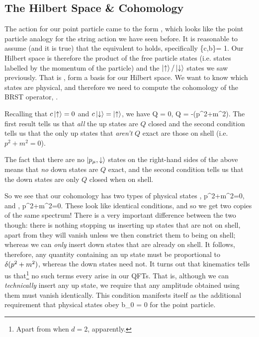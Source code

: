 \subsection{The Hilbert Space \& Cohomology}

The action for our point particle came to the form , which looks like the point particle analogy for the string action we have seen before. It is reasonable to assume (and it is true) that the equivalent to  holds, specifically 
\bse
    \{c,b\}= 1.
\ese 
Our Hilbert space is therefore the product of the free particle states (i.e. states labelled by the momentum of the particle) and the $\ket{\uparrow}/\ket{\downarrow}$ states we saw previously. That is 
\bse 
    , \qand {}
\ese
form a basis for our Hilbert space. We want to know which states are physical, and therefore we need to compute the cohomology of the BRST operator, .

Recalling that $c\ket{\uparrow}=0$ and $c\ket{\downarrow}=\ket{\uparrow}$, we have 
\bse 
    Q = 0, \qand Q = -\big(p^2+m^2\big).
\ese 
The first result tells us that \textit{all} the up states are $Q$ closed and the second condition tells us that the only up states that \textit{aren't} $Q$ exact are those on shell (i.e. $p^2+m^2=0$). 

The fact that there are no $\ket{p_{\mu},\downarrow}$ states on the right-hand sides of the above means that \textit{no} down states are $Q$ exact, and the second condition tells us that the down states are only $Q$ closed when on shell. 

So we see that our cohomology has two types of physical states 
\bse 
    , \quad p^2+m^2=0, 
\ese 
and 
\bse 
    , \quad p^2+m^2=0.
\ese
These look like identical conditions, and so we get two copies of the same spectrum! There is a very important difference between the two though: there is nothing stopping us inserting up states that are not on shell, apart from they will vanish unless we then constrict them to being on shell; whereas we can \textit{only} insert down states that are already on shell. It follows, therefore, any quantity containing an up state must be proportional to $\delta(p^2+m^2)$, whereas the down states need not. It turns out that kinematics tells us that\footnote{Apart from when $d=2$, apparently.} no such terms every arise in our QFTs. That is, although we can \textit{technically} insert any up state, we require that any amplitude obtained using them must vanish identically. This condition manifests itself as the additional requirement that physical states obey 
\bse 
    b_0\ket{\psi} = 0
\ese
for the point particle.

